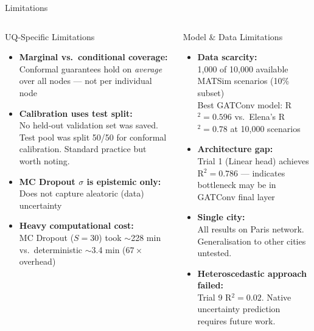 \documentclass[aspectratio=169,10pt]{beamer}
\begin{document}
\begin{frame}{Limitations}
  \begin{columns}[t]
      \begin{alertblock}{UQ-Specific Limitations}
        \begin{itemize}
          \item \textbf{Marginal vs.\ conditional coverage:}\\
            Conformal guarantees hold on \emph{average} over all nodes — not per individual node
          \item \textbf{Calibration uses test split:}\\
            No held-out validation set was saved. Test pool was split 50/50 for conformal calibration. Standard practice but worth noting.
          \item \textbf{MC Dropout $\sigma$ is epistemic only:}\\
            Does not capture aleatoric (data) uncertainty
          \item \textbf{Heavy computational cost:}\\
            MC Dropout ($S=30$) took $\sim$228 min vs.\ deterministic $\sim$3.4 min ($67\times$ overhead)
        \end{itemize}
      \end{alertblock}
      \begin{alertblock}{Model \& Data Limitations}
        \begin{itemize}
          \item \textbf{Data scarcity:}\\
            1,000 of 10,000 available MATSim scenarios (10\% subset)\\
            Best GATConv model: R$^2 = 0.596$ vs.\ Elena's R$^2 = 0.78$ at 10,000 scenarios
          \item \textbf{Architecture gap:}\\
            Trial 1 (Linear head) achieves R$^2 = 0.786$ — indicates bottleneck may be in GATConv final layer
          \item \textbf{Single city:}\\
            All results on Paris network. Generalisation to other cities untested.
          \item \textbf{Heteroscedastic approach failed:}\\
            Trial 9 R$^2 = 0.02$. Native uncertainty prediction requires future work.
        \end{itemize}
      \end{alertblock}
  \end{columns}
\end{frame}
\end{document}

